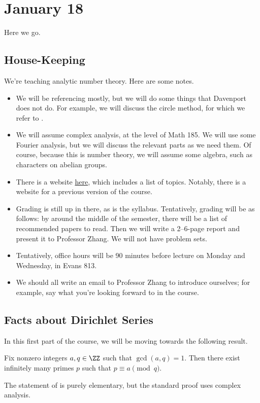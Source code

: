 \documentclass[../notes.tex]{subfiles}
\begin{document}
\section{January 18}

Here we go.

\subsection{House-Keeping}
We're teaching analytic number theory. Here are some notes.
\begin{itemize}
	\item We will be referencing \cite{davenport-mult-nt} mostly, but we will do some things that Davenport does not do. For example, we will discuss the circle method, for which we refer to \cite{davenport-ineqs}.
	\item We will assume complex analysis, at the level of Math 185. We will use some Fourier analysis, but we will discuss the relevant parts as we need them. Of course, because this is number theory, we will assume some algebra, such as characters on abelian groups.
	\item There is a website \href{https://sites.google.com/view/ruixiang-zhang/home/teaching/math191_spring2023}{here}, which includes a list of topics. Notably, there is a website for a previous version of the course.
	\item Grading is still up in there, as is the syllabus. Tentatively, grading will be as follows: by around the middle of the semester, there will be a list of recommended papers to read. Then we will write a 2--6-page report and present it to Professor Zhang. We will not have problem sets.
	\item Tentatively, office hours will be 90 minutes before lecture on Monday and Wednesday, in Evans 813.
	\item We should all write an email to Professor Zhang to introduce ourselves; for example, say what you're looking forward to in the course.
\end{itemize}

\subsection{Facts about Dirichlet Series}
In this first part of the course, we will be moving towards the following result.
\begin{theorem}[Dirichlet] \label{thm:dirichlet}
	Fix nonzero integers $a,q\in\ZZ$ such that $\gcd(a,q)=1$. Then there exist infinitely many primes $p$ such that $p\equiv a\pmod q$.
\end{theorem}
The statement of  is purely elementary, but the standard proof uses complex analysis.
\end{document}
